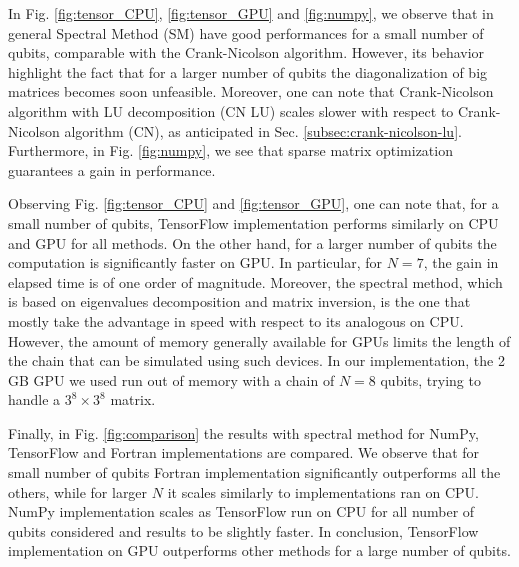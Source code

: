 \documentclass[rmp,10pt,onecolumn,fleqn,notitlepage]{revtex4-1}
\begin{document}
In Fig. \ref{fig:tensor_CPU}, \ref{fig:tensor_GPU} and \ref{fig:numpy}, we observe that in general Spectral Method (SM) have good performances for a small number of qubits, comparable with the Crank-Nicolson algorithm. However, its behavior highlight the fact that for a larger number of qubits the diagonalization of big matrices becomes soon unfeasible. Moreover, one can note that Crank-Nicolson algorithm with LU decomposition (CN LU) scales slower with respect to Crank-Nicolson algorithm (CN), as anticipated in Sec. \ref{subsec:crank-nicolson-lu}.
Furthermore, in Fig. \ref{fig:numpy}, we see that sparse matrix optimization guarantees a gain in performance. 

Observing Fig. \ref{fig:tensor_CPU} and \ref{fig:tensor_GPU}, one can note that, for a small number of qubits, TensorFlow implementation performs similarly on CPU and GPU for all methods. On the other hand, for a larger number of qubits the computation is significantly faster on GPU. In particular, for $N=7$, the gain in elapsed time is of one order of magnitude. Moreover, the spectral method, which is based on eigenvalues decomposition and matrix inversion, is the one that mostly take the advantage in speed with respect to its analogous on CPU. However, the amount of memory generally available for GPUs limits the length of the chain that can be simulated using such devices. In our implementation, the 2 GB GPU we used run out of memory with a chain of $N=8$ qubits, trying to handle a $ 3^8 \times 3^8$ matrix.

Finally, in Fig. \ref{fig:comparison} the results with spectral method for NumPy, TensorFlow and Fortran implementations are compared. We observe that for small number of qubits Fortran implementation significantly outperforms all the others, while for larger $N$ it scales similarly to implementations ran on CPU. NumPy implementation scales as TensorFlow run on CPU for all number of qubits considered and results to be slightly faster. In conclusion, TensorFlow implementation on GPU outperforms other methods for a large number of qubits. 
\end{document}
